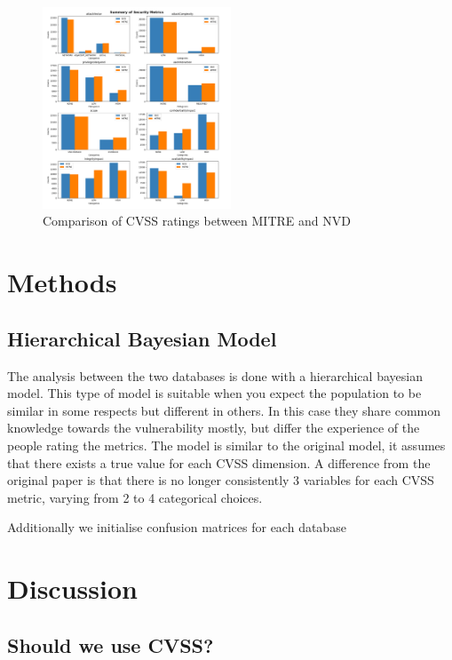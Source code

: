 \documentclass[12pt]{article}
\begin{document}
\begin{figure}
	\centering
	\includegraphics[width=0.5\textwidth]{figures/combined_overlap.png}
	\caption{\label{fig:counts}Comparison of CVSS ratings between MITRE and NVD}
\end{figure}

\section{Methods}

\subsection{Hierarchical Bayesian Model}

The analysis between the two databases is done with a hierarchical bayesian model. This type of model is suitable when you expect the population to be
similar in some respects but different in others. In this case they share common knowledge towards the vulnerability mostly, but differ the experience
of the people rating the metrics.\cite{bayes} The model is similar to the original model, it assumes that there exists a true value for each CVSS
dimension. A difference from the original paper is that there is no longer consistently 3 variables for each CVSS metric, varying from 2 to 4
categorical choices.

Additionally
we initialise confusion matrices for each database
\section{Discussion}

\subsection{Should we use CVSS?}
\end{document}
